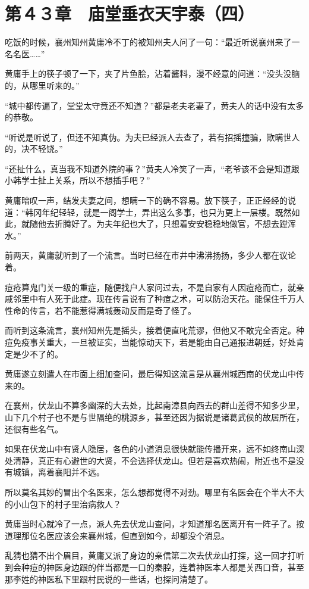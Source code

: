 \section{第４３章　庙堂垂衣天宇泰（四）}

吃饭的时候，襄州知州黄庸冷不丁的被知州夫人问了一句：“最近听说襄州来了一名名医……”

黄庸手上的筷子顿了一下，夹了片鱼脍，沾着酱料，漫不经意的问道：“没头没脑的，从哪里听来的。”

“城中都传遍了，堂堂太守竟还不知道？”都是老夫老妻了，黄夫人的话中没有太多的恭敬。

“听说是听说了，但还不知真伪。为夫已经派人去查了，若有招摇撞骗，欺瞒世人的，决不轻饶。”

“还扯什么，真当我不知道外院的事？”黄夫人冷笑了一声，“老爷该不会是知道跟小韩学士扯上关系，所以不想插手吧？”

黄庸暗叹一声，结发夫妻之间，想瞒一下的确不容易。放下筷子，正正经经的说道：“韩冈年纪轻轻，就是一阁学士，弄出这么多事，也只为更上一层楼。既然如此，就随他去折腾好了。为夫年纪也大了，只想着安安稳稳地做官，不想去蹚浑水。”

前两天，黄庸就听到了一个流言。当时已经在市井中沸沸扬扬，多少人都在议论着。

痘疮算鬼门关一级的重症，随便找户人家问过去，不是自家有人因痘疮而亡，就亲戚邻里中有人死于此症。现在传言说有了种痘之术，可以防治天花。能保住千万人性命的传言，若不能惹得满城轰动反而是奇了怪了。

而听到这条流言，襄州知州先是摇头，接着便直叱荒谬，但他又不敢完全否定。种痘免疫事关重大，一旦被证实，当能惊动天下，若是能由自己通报进朝廷，好处肯定是少不了的。

黄庸遂立刻遣人在市面上细加查问，最后得知这流言是从襄州城西南的伏龙山中传来的。

在襄州，伏龙山不算多幽深的大去处，比起南漳县向西去的群山差得不知多少里，山下几个村子也不是与世隔绝的桃源乡，甚至还因为据说是诸葛武侯的故居所在，还很有些名气。

如果在伏龙山中有贤人隐居，各色的小道消息很快就能传播开来，远不如终南山深处清静，真正有心避世的大贤，不会选择伏龙山。但若是喜欢热闹，附近也不是没有城镇，离着襄阳并不远。

所以莫名其妙的冒出个名医来，怎么想都觉得不对劲。哪里有名医会在个半大不大的小山包下的村子里治病救人？

黄庸当时心就冷了一点，派人先去伏龙山查问，才知道那名医离开有一阵子了。按道理那位名医应该会来襄州城，但直到如今，却都没个消息。

乱猜也猜不出个眉目，黄庸又派了身边的亲信第二次去伏龙山打探，这一回才打听到会种痘的神医身边跟的伴当都是一口的秦腔，连着神医本人都是关西口音，甚至那李姓的神医私下里跟村民说的一些话，也探问清楚了。


